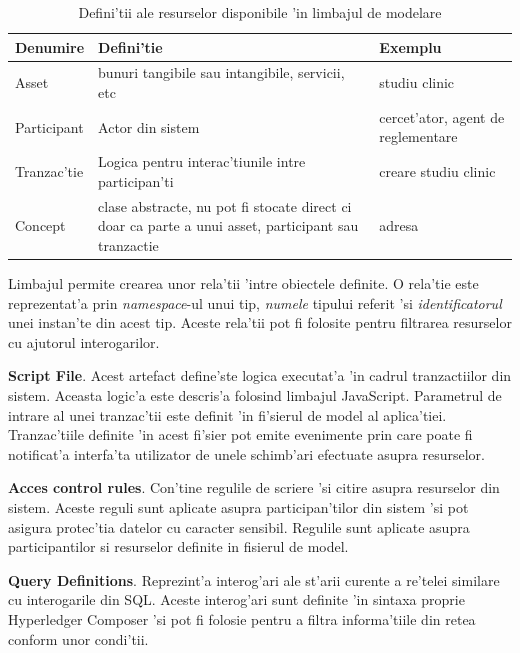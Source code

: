 \documentclass[12pt,a4paper,twoside]{report}
\begin{document}
\begin{table}[H]
\caption{Defini'tii ale resurselor disponibile 'in limbajul de modelare}
\centering
\begin{tabular}{|p{2cm}|p{5cm}|p{5cm}|}      
\hline\hline                        
Denumire & Defini'tie & Exemplu \\ [0.5ex]   %
\hline                             
Asset & bunuri tangibile sau intangibile, servicii, etc & studiu clinic\\ 
\hline  
Participant & Actor din sistem & cercet'ator, agent de reglementare\\              
\hline 
Tranzac'tie  & Logica pentru interac'tiunile intre participan'ti & creare studiu clinic   \\
\hline
Concept & clase abstracte, nu pot fi stocate direct ci doar ca parte a unui asset, participant sau tranzactie & adresa \\
[1ex]
           
\hline                              
\end{tabular}
\label{table3} 
\end{table}


Limbajul permite crearea unor rela'tii 'intre obiectele definite. O rela'tie este reprezentat'a prin \emph{namespace}-ul unui tip, \emph{numele} tipului referit 'si \emph{identificatorul} unei instan'te din acest tip. Aceste rela'tii pot fi folosite pentru filtrarea resurselor cu ajutorul interogarilor.

\textbf{Script File}. Acest artefact define'ste logica executat'a 'in cadrul tranzactiilor din sistem. Aceasta logic'a este descris'a folosind limbajul JavaScript. Parametrul de intrare al unei tranzac'tii este definit 'in fi'sierul de model al aplica'tiei. Tranzac'tiile definite 'in acest fi'sier pot emite evenimente prin care poate fi notificat'a interfa'ta utilizator de unele schimb'ari efectuate asupra resurselor.

\textbf{Acces control rules}. Con'tine regulile de scriere 'si citire asupra resurselor din sistem. Aceste reguli sunt aplicate asupra participan'tilor din sistem 'si pot asigura protec'tia datelor cu caracter sensibil. Regulile sunt aplicate asupra participantilor si resurselor definite in fisierul de model.

\textbf{Query Definitions}. Reprezint'a interog'ari ale st'arii curente a re'telei similare cu interogarile din SQL. Aceste interog'ari sunt definite 'in sintaxa proprie Hyperledger Composer 'si pot fi folosie pentru a filtra informa'tiile din retea conform unor condi'tii.
\end{document}
